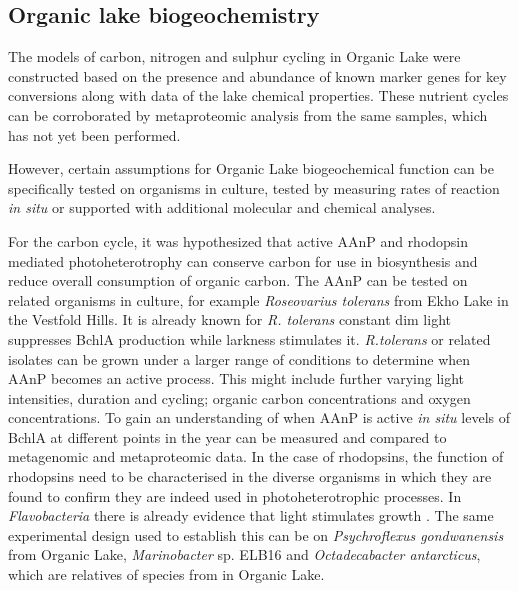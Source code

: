 \subsection{Organic lake biogeochemistry}
The models of carbon, nitrogen and sulphur cycling in Organic Lake were constructed based on the presence and abundance of known marker genes for key conversions along with data of the lake chemical properties.
These nutrient cycles can be corroborated by metaproteomic analysis from the same samples, which has not yet been performed. 

However, certain assumptions for Organic Lake biogeochemical function can be specifically tested on organisms in culture, tested by measuring rates of reaction \emph{in situ} or supported with additional molecular and chemical analyses.

For the carbon cycle, it was hypothesized that active \ac{AAnP} and rhodopsin mediated photoheterotrophy can conserve carbon for use in biosynthesis and reduce overall consumption of organic carbon.
The \ac{AAnP} can be tested on related organisms in culture, for example \emph{Roseovarius tolerans} from Ekho Lake in the Vestfold Hills. 
It is already known for \emph{R. tolerans} constant dim light suppresses \ac{BchlA} production while larkness stimulates it\cite{Labrenz1999}.
\emph{R.tolerans} or related isolates can be grown under a larger range of conditions to determine when \ac{AAnP} becomes an active process.
This might include further varying light intensities, duration and cycling; organic carbon concentrations and oxygen concentrations.
To gain an understanding of when \ac{AAnP} is active \emph{in situ} levels of \ac{BchlA} at different points in the year can be measured and compared to metagenomic and metaproteomic data.
In the case of rhodopsins, the function of rhodopsins need to be characterised in the diverse organisms in which they are found to confirm they are indeed used in photoheterotrophic processes.
In \emph{Flavobacteria} there is already evidence that light stimulates growth \cite{Gomez-Consarnau2007}.
The same experimental design used to establish this can be on \emph{Psychroflexus gondwanensis} from Organic Lake, \emph{Marinobacter} sp. ELB16 and \emph{Octadecabacter antarcticus}, which are relatives of species from in Organic Lake.

